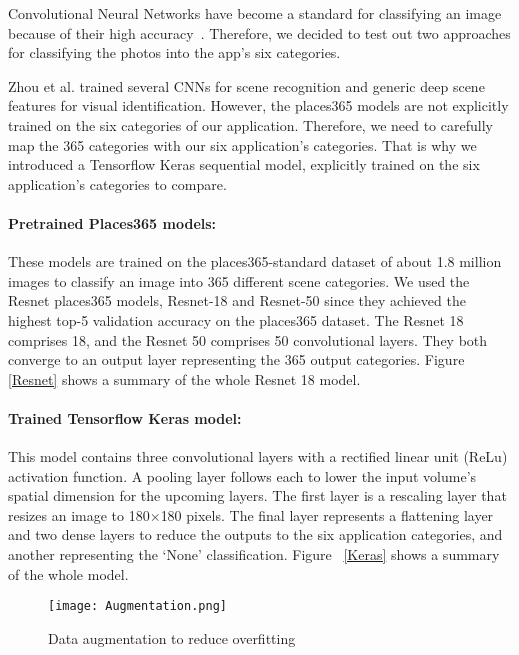 Convolutional Neural Networks have become a standard
for classifying an image because of their high
accuracy~\cite{Zhou2018}. Therefore, we decided to test
out two approaches for classifying the photos into the
app's six categories. 

Zhou et al. \cite{Zhou2018} trained several CNNs for
scene recognition and generic deep scene features for
visual identification. However, the places365 models
are not explicitly trained on the six categories of
our application. Therefore, we need to carefully map
the 365 categories with our six application's
categories. That is why we introduced a Tensorflow
Keras sequential model, explicitly trained on the six
application's categories to compare.

\paragraph{Pretrained Places365 models:} These models
are trained on the places365-standard dataset of about
1.8 million images to classify an image into 365
different scene categories. We used the Resnet
places365 models, Resnet-18 and Resnet-50 since they
achieved the highest top-5 validation accuracy on the
places365 dataset. The Resnet 18 comprises 18, and the
Resnet 50 comprises 50 convolutional layers. They both
converge to an output layer representing the 365
output categories.  Figure \ref{Resnet} shows a
summary of the whole Resnet 18 model.

\paragraph{Trained Tensorflow Keras model: } This
model contains three convolutional layers with a
rectified linear unit (ReLu) activation function. A
pooling layer follows each to lower the input volume's
spatial dimension for the upcoming layers. The first
layer is a rescaling layer that resizes an image to
180$\times$180 pixels. The final layer represents a
flattening layer and two dense layers to reduce the
outputs to the six application categories, and another
representing the `None' classification. Figure
~\ref{Keras} shows a summary of the whole model.

\begin{figure}[h]
\centering
\texttt{[image: Augmentation.png]}
\caption{Data augmentation to reduce overfitting}
\label{Augmentation}
\end{figure}

